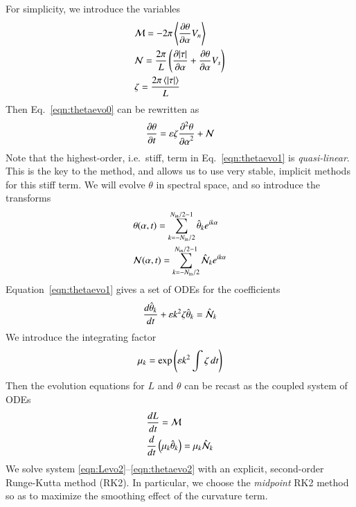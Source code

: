 \documentclass[preprint, 10pt]{elsarticle}
\begin{document}
For simplicity, we introduce the variables
\begin{align}
\label{eq:M}
& \mathcal{M} = - 2 \pi \left< \frac{\partial \theta}{\partial \alpha} V_n \right> \\
\label{eq:N}
& \mathcal{N} = \frac{2 \pi}{L} \left( \frac{\partial \lvert \tau \rvert}{\partial \alpha} + \frac{\partial \theta}{\partial \alpha} V_s \right) \\
\label{eq:elfun}
& \zeta = \frac{2 \pi  \left< \lvert \tau \rvert \right>}{L}
\end{align} 
Then Eq.~\eqref{eqn:thetaevo0} can be rewritten as
\begin{equation}
\label{eqn:thetaevo1}
\frac{\partial \theta}{\partial t} = \varepsilon \zeta \frac{\partial^2 \theta}{{\partial \alpha}^2} + \mathcal{N}
\end{equation}
Note that the highest-order, i.e.~stiff, term in Eq.~\eqref{eqn:thetaevo1} is {\em quasi-linear}. This is the key to the {\thL} method, and allows us to use very stable, implicit methods for this stiff term. We will evolve $\theta$ in spectral space, and so introduce the transforms
\begin{align}
& \theta(\alpha,t) = \sum_{k = -N_{\mathrm{in}} /2}^{N_{\mathrm{in}} /2-1} \hat{\theta}_k e^{ i k \alpha} \\
& \mathcal{N}(\alpha,t)  = \sum_{k = -N_{\mathrm{in}} /2}^{N_{\mathrm{in}} /2-1} \hat{\mathcal{N}}_k e^{ i k \alpha}
\end{align}
Equation~\eqref{eqn:thetaevo1} gives a set of ODEs for the coefficients
\begin{equation}
\frac{d \hat{\theta}_k}{d t} +  \varepsilon k^2  \zeta \hat{\theta}_k = \hat{\mathcal{N}}_k
\end{equation}
We introduce the integrating factor
\begin{equation}
\label{eq:mu}
\mu_k = \exp \left( \varepsilon k^2 \int \zeta \, dt \right)
\end{equation}
Then the evolution equations for $L$ and $\theta$ can be recast as the coupled system of ODEs
\begin{align}
\label{eqn:Levo2}
& \frac{d L}{d t} = \mathcal{M} \\
\label{eqn:thetaevo2}
& \frac{d }{d t}\left( \mu_k \hat{\theta}_k \right) = \mu_k \hat{\mathcal{N}}_k
\end{align}
We solve system \eqref{eqn:Levo2}--\eqref{eqn:thetaevo2} with an explicit, second-order Runge-Kutta method (RK2). In particular, we choose the {\em midpoint} RK2 method so as to maximize the smoothing effect of the curvature term.
\end{document}
